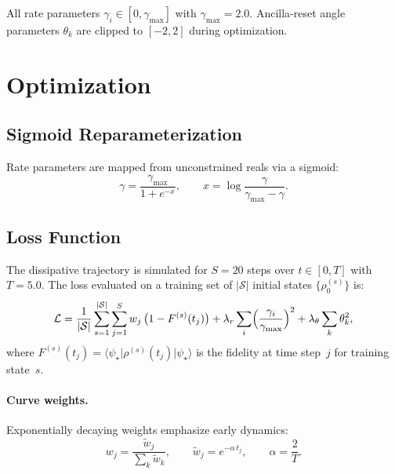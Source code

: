 \documentclass[11pt,a4paper]{article}
\newcommand{\ket}[1]{\lvert #1 \rangle}
\newcommand{\bra}[1]{\langle #1 \rvert}
\begin{document}
All rate parameters $\gamma_i \in [0,\gamma_{\max}]$ with
$\gamma_{\max}=2.0$.  Ancilla-reset angle parameters $\theta_k$
are clipped to $[-2,2]$ during optimization.

\section{Optimization}

\subsection{Sigmoid Reparameterization}

Rate parameters are mapped from unconstrained reals via a sigmoid:
\begin{equation}\label{eq:sigmoid}
  \gamma = \frac{\gamma_{\max}}{1 + e^{-x}},
  \qquad
  x = \log\frac{\gamma}{\gamma_{\max}-\gamma}.
\end{equation}

\subsection{Loss Function}

The dissipative trajectory is simulated for $S=20$ steps over
$t\in[0,T]$ with $T=5.0$.  The loss evaluated on a training set
of $|\mathcal{S}|$ initial states $\{\rho_0^{(s)}\}$ is:
\begin{equation}\label{eq:loss}
  \mathcal{L}
  = \frac{1}{|\mathcal{S}|}
    \sum_{s=1}^{|\mathcal{S}|}
    \sum_{j=1}^{S} w_j\,\bigl(1 - F^{(s)}(t_j)\bigr)
  + \lambda_r \sum_i \Bigl(\frac{\gamma_i}{\gamma_{\max}}\Bigr)^2
  + \lambda_\theta \sum_k \theta_k^2,
\end{equation}
where $F^{(s)}(t_j) = \bra{\psi_\star}\rho^{(s)}(t_j)\ket{\psi_\star}$
is the fidelity at time step~$j$ for training state~$s$.

\paragraph{Curve weights.}
Exponentially decaying weights emphasize early dynamics:
\begin{equation}
  w_j = \frac{\tilde w_j}{\sum_k \tilde w_k},
  \qquad
  \tilde w_j = e^{-\alpha\,t_j},
  \qquad
  \alpha = \frac{2}{T}.
\end{equation}
\end{document}
